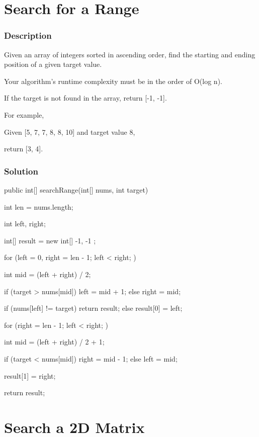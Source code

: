 \newpage

\section{Search for a Range} %

\subsubsection{Description}
Given an array of integers sorted in ascending order, find the starting and ending position of a given target value.

Your algorithm's runtime complexity must be in the order of O(log n).

If the target is not found in the array, return [-1, -1].

For example,

Given [5, 7, 7, 8, 8, 10] and target value 8,

return [3, 4].

\subsubsection{Solution}

\begin{Code}
public int[] searchRange(int[] nums, int target) {
    int len = nums.length;

    int left, right;

    int[] result = new int[] { -1, -1 };

    for (left = 0, right = len - 1; left < right; ) {
        int mid = (left + right) / 2;

        if (target > nums[mid]) {
            left = mid + 1;
        } else {
            right = mid;
        }
    }

    if (nums[left] != target) {
        return result;
    } else {
        result[0] = left;
    }

    for (right = len - 1; left < right; ) {
        int mid = (left + right) / 2 + 1;

        if (target < nums[mid]) {
            right = mid - 1;
        } else {
            left = mid;
        }
    }

    result[1] = right;

    return result;
}
\end{Code}

\newpage

\section{Search a 2D Matrix} %


